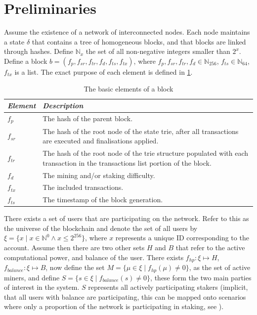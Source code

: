 \documentclass[a4paper]{article}
\begin{document}
\section{Preliminaries}

Assume the existence of a network of interconnected nodes. Each node maintains a state $\delta$ that contains a tree of homogeneous blocks, and that blocks are linked through hashes. Define $\mathbb{N}_{x}$ the set of all non-negative integers smaller than $2^x$. Define a block $b = (f_{p}, f_{sr}, f_{tr}, f_{d}, f_{ts}, f_{tx})$, where $f_{p}, f_{sr}, f_{tr}, f_{d} \in \mathbb{N}_{256}$, $f_{ts} \in \mathbb{N}_{64}$, $f_{tx}$ is a list. The exact purpose of each element is defined in \cref{tab:block}.

\begin{table}[h]
    \centering
    \begin{tabularx}{0.8\textwidth}{l X}
        \toprule
        \textbf{\emph{Element}} & \textbf{\emph{Description}} \\
        \midrule
        $f_{p}$ & The hash of the parent block.\\
        $f_{sr}$ & The hash of the root node of the state trie, after all transactions are executed and finalisations applied.\\
        $f_{tr}$ & The hash of the root node of the trie structure populated with each transaction in the transactions list portion of the block.\\
        $f_{d}$ & The mining and/or staking difficulty.\\
        $f_{tx}$ & The included transactions.\\
        $f_{ts}$ & The timestamp of the block generation.\\
        \bottomrule
    \end{tabularx}
    \caption{The basic elements of a block}
    \label{tab:block}
\end{table}

There exists a set of users that are participating on the network. Refer to this as the universe of the blockchain and denote the set of all users by $\xi = \{x \mid x \in \mathbb{N}^{0} \wedge x \leq 2^{256}\}$, where $x$ represents a unique ID corresponding to the account. Assume then there are two other sets $H$ and $B$ that refer to the active computational power, and balance of the user. There exists $f_{hp} : \xi \longmapsto H$, $f_{balance} : \xi \longmapsto B$, now define the set $M = \{\mu \in \xi \mid f_{hp}(\mu) \neq 0\}$, as the set of active miners, and define $S = \{s \in \xi \mid f_{balance}(s) \neq 0 \}$, these form the two main parties of interest in the system. $S$ represents all actively participating stakers (implicit, that all users with balance are participating, this can be mapped onto scenarios where only a proportion of the network is participating in staking, see \cite{popov2016probabilistic}).
\end{document}

